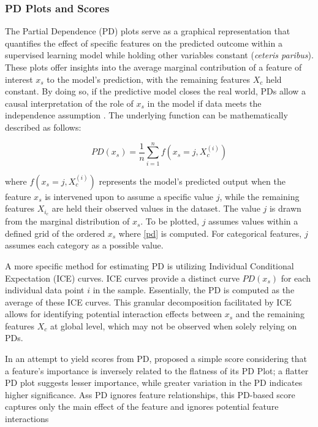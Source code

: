 \subsubsection{PD Plots and Scores}
\label{subpdp}

The Partial Dependence (PD) plots serve as a graphical representation that quantifies the effect of specific features on the predicted outcome within a supervised learning model while holding other variables constant (\textit{ceteris paribus}). These plots offer insights into the average marginal contribution of a feature of interest $x_s$ to the model's prediction, with the remaining features $X_c$ held constant. By doing so, if the predictive model closes the real world, \gls{PD}s allow a causal interpretation of the role of $x_s$ in the model if data meets the independence assumption \cite{Zhao2021CausalModels}. The underlying function can be mathematically described as follows:

\begin{equation}
PD(x_s)=\frac{1}{n}\sum_{i=1}^{n}f(x_s=j, X^{(i)}_{c})
\label{pd}
\end{equation}

where $f(x_s = j, X^{(i)}_{c})$  represents the model's predicted output when the feature  $x_s$ is intervened upon to assume a specific value $j$, while the remaining features $X_{i_{c}}$ are held their observed values in the dataset. The value $j$ is drawn from the marginal distribution of $x_s$. To be plotted, $j$ assumes values within a defined grid of the ordered $x_s$ where \ref{pd} is computed. For categorical features, $j$ assumes each category as a possible value.

A more specific method for estimating PD is utilizing Individual Conditional Expectation (ICE) curves. ICE curves \cite{Goldstein2015PeekingExpectation} provide a distinct curve $PD(x_s)$ for each individual data point $i$ in the sample. Essentially, the PD is computed as the average of these ICE curves. This granular decomposition facilitated by ICE allows for identifying potential interaction effects between $x_s$ and the remaining features $X_c$ at global level, which may not be observed when solely relying on \gls{PD}s. 

In an attempt to yield scores from \gls{PD}, \cite{Greenwell2018AMeasure} proposed a simple score considering that a feature's importance is inversely related to the flatness of its \gls{PD} Plot; a flatter \gls{PD} plot suggests lesser importance, while greater variation in the \gls{PD} indicates higher significance. Ass \gls{PD} ignores feature relationships, this \gls{PD}-based score captures only the main effect of the feature and ignores potential feature interactions

